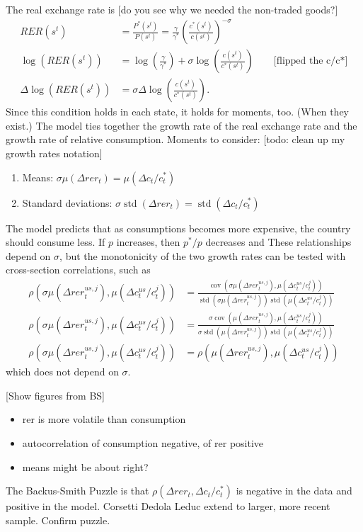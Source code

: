 \documentclass[11pt,pdftex,twoside,letterpaper]{exam}
\DeclareMathOperator{\std}{\mathrm{std}}
\DeclareMathOperator{\cov}{\mathrm{cov}}
\begin{document}
The real exchange rate is [do you see why we needed the non-traded goods?]
\begin{align}
  RER(s^t) &= \frac{P^*(s^t)}{P(s^t)}=\frac{\gamma}{\gamma^*}\left(\frac{c^*(s^t)}{c(s^t)} \right)^{-\sigma} \label{eq:bs-risk-sharing}\\
  \log(RER(s^t)) &= \log(\frac{\gamma}{\gamma^*}) + \sigma \log \left(  \frac{c(s^t)}{c^*(s^t)} \right) \qquad \textrm{[flipped the c/c*]}\\
  \Delta \log(RER(s^t)) &=\sigma \Delta \log \left(  \frac{c(s^t)}{c^*(s^t)} \right).
\end{align}
Since this condition holds in each state, it holds for moments, too. (When they exist.) The model ties together the growth rate of the real exchange rate and the growth rate of relative consumption. Moments to consider: [todo: clean up my growth rates notation]
\begin{enumerate}
  \item Means: $\sigma \mu(\Delta rer_t) = \mu(\Delta c_t/c^*_t)$
  \item Standard deviations: $\sigma \std(\Delta rer_t) = \std(\Delta c_t/c^*_t)$
\end{enumerate}
The model predicts that as consumptions becomes more expensive, the country should consume less. If $p$ increases, then $p^*/p$ decreases and
These relationships depend on $\sigma$, but the monotonicity of the two growth rates can be tested with cross-section correlations, such as
\begin{align}
  \rho(\sigma \mu(\Delta rer_t^{us,j}), \mu(\Delta c_t^{us}/c^j_t))&=\frac{\cov(\sigma \mu(\Delta rer_t^{us,j}), \mu(\Delta c_t^{us}/c^j_t))}{\std(\sigma \mu(\Delta rer_t^{us,j}))\std(\mu(\Delta c_t^{us}/c^j_t))}\\
  \rho(\sigma \mu(\Delta rer_t^{us,j}), \mu(\Delta c_t^{us}/c^j_t))&=\frac{\sigma \cov(\mu(\Delta rer_t^{us,j}), \mu(\Delta c_t^{us}/c^j_t))}{\sigma\std( \mu(\Delta rer_t^{us,j}))\std(\mu(\Delta c_t^{us}/c^j_t))}\\
  \rho(\sigma \mu(\Delta rer_t^{us,j}), \mu(\Delta c_t^{us}/c^j_t))&=\rho(\mu(\Delta rer_t^{us,j}), \mu(\Delta c_t^{us}/c^j_t))
\end{align}
which does not depend on $\sigma$.

[Show figures from BS]

\begin{itemize}
  \item rer is more volatile than consumption
  \item autocorrelation of consumption negative, of rer positive
  \item means might be about right?
\end{itemize}
The Backus-Smith Puzzle is that $\rho(\Delta rer_t, \Delta c_t/c^*_t)$ is negative in the data and positive in the model.
Corsetti Dedola Leduc extend to larger, more recent sample. Confirm puzzle.
\end{document}
